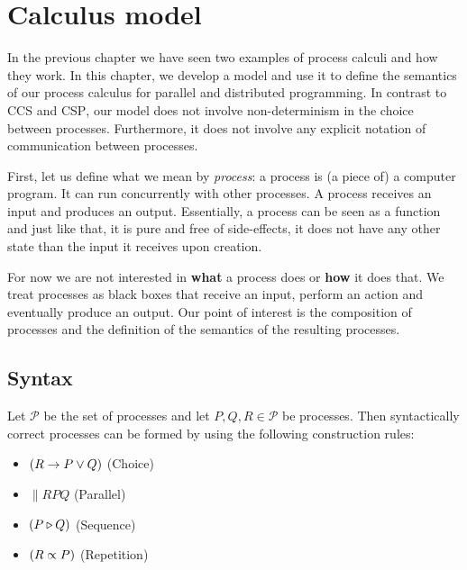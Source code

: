 \chapter{Calculus model}
\label{chp:algebraic_model}
In the previous chapter we have seen two examples of process calculi and how they work. In this chapter, we develop a model and use it to define the semantics of our process calculus for parallel and distributed programming. In contrast to \textsc{CCS} and \textsc{CSP}, our model does not involve non-determinism in the choice between processes. Furthermore, it does not involve any explicit notation of communication between processes.

First, let us define what we mean by \textit{process}: a process is (a piece of) a computer program. It can run concurrently with other processes. A process receives an input and produces an output. Essentially, a process can be seen as a function and just like that, it is pure and free of side-effects, it does not have any other state than the input it receives upon creation.

For now we are not interested in \textbf{what} a process does or \textbf{how} it does that. We treat processes as black boxes that receive an input, perform an action and eventually produce an output. Our point of interest is the composition of processes and the definition of the semantics of the resulting processes.

\section{Syntax}
\label{chp:syntax}
Let $\mathcal{P}$ be the set of processes and let $P, Q, R \in \mathcal{P}$ be processes. Then syntactically correct processes can be formed by using the following construction rules:
\begin{itemize}
  \item $\left( R \to P \vee Q \right)$ \hspace*{2.3em} (Choice)
  \item $\parallel{R}{P}{Q}$ \hspace*{2.8em} (Parallel)
  \item $\left( P \triangleright Q \right)$ \hspace*{4.8em} (Sequence)
  \item $\left( R \propto P \right)$ \hspace*{4.4em} (Repetition)
\end{itemize}

